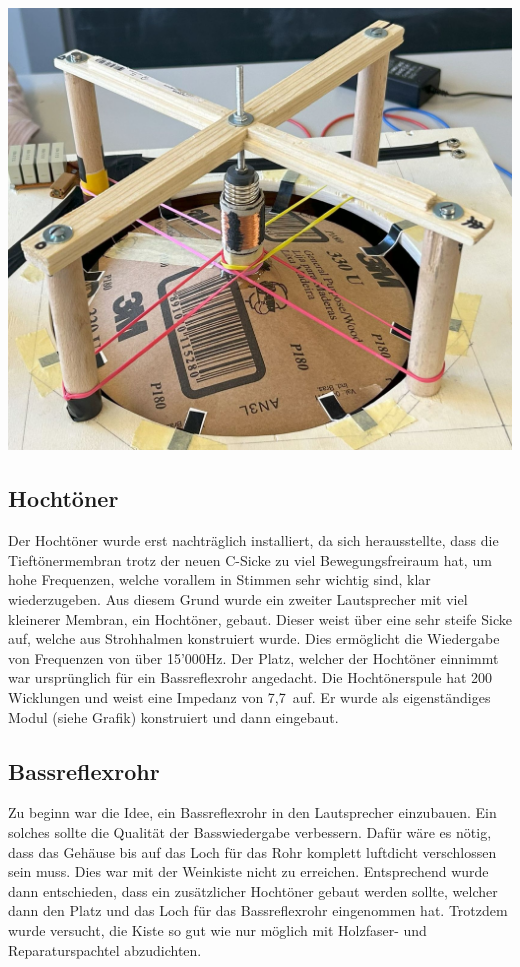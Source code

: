 \documentclass[a4paper,11pt]{report}
\begin{document}
\begin{minipage}{0.3\textwidth}
    \centering
    \includegraphics[width=.8\linewidth]{resources/images/Fotos/Physik-119.jpg}
    \label{fig:deep_fin}
\end{minipage}

\newpage
\subsection{Hochtöner}
Der Hochtöner wurde erst nachträglich installiert, da sich herausstellte, dass die Tieftönermembran trotz der neuen C-Sicke zu viel Bewegungsfreiraum hat, um hohe Frequenzen, welche vorallem in Stimmen sehr wichtig sind, klar wiederzugeben. Aus diesem Grund wurde ein zweiter Lautsprecher mit viel kleinerer Membran, ein Hochtöner, gebaut. Dieser weist über eine sehr steife Sicke auf, welche aus Strohhalmen konstruiert wurde. Dies ermöglicht die Wiedergabe von Frequenzen von über 15'000Hz. Der Platz, welcher der Hochtöner einnimmt war ursprünglich für ein Bassreflexrohr angedacht. Die Hochtönerspule hat 200 Wicklungen und weist eine Impedanz von 7,7\Omega\  auf. Er wurde als eigenständiges Modul (siehe Grafik) konstruiert und dann eingebaut.

\subsection{Bassreflexrohr}
Zu beginn war die Idee, ein Bassreflexrohr in den Lautsprecher einzubauen. Ein solches sollte die Qualität der Basswiedergabe verbessern. Dafür wäre es nötig, dass das Gehäuse bis auf das Loch für das Rohr komplett luftdicht verschlossen sein muss. Dies war mit der Weinkiste nicht zu erreichen. Entsprechend wurde dann entschieden, dass ein zusätzlicher Hochtöner gebaut werden sollte, welcher dann den Platz und das Loch für das Bassreflexrohr eingenommen hat. Trotzdem wurde versucht, die Kiste so gut wie nur möglich mit Holzfaser- und Reparaturspachtel abzudichten. 
\end{document}
